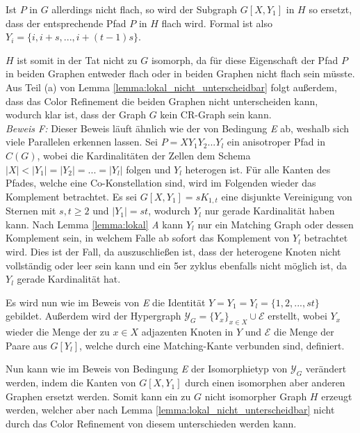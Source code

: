 Ist $P$ in $G$ allerdings nicht flach, so wird der Subgraph $G[X,Y_1]$ in $H$ so ersetzt, dass der entsprechende Pfad $P$ in $H$ flach wird.
Formal ist also $Y_i=\{i,i+s,...,i+(t-1)s\}$.

$H$ ist somit in der Tat nicht zu $G$ isomorph, da für diese Eigenschaft der Pfad $P$ in beiden Graphen entweder flach oder in beiden Graphen nicht flach sein müsste.
Aus Teil (a) von Lemma \ref{lemma:lokal_nicht_unterscheidbar} folgt außerdem, dass das Color Refinement die beiden Graphen nicht unterscheiden kann, wodurch klar ist, dass der Graph $G$ kein CR-Graph sein kann.\\

\emph{Beweis F:} Dieser Beweis läuft ähnlich wie der von Bedingung \emph{E} ab, weshalb sich viele Parallelen erkennen lassen.
Sei $P=XY_1Y_2...Y_l$ ein anisotroper Pfad in $C(G)$, wobei die Kardinalitäten der Zellen dem Schema $|X|<|Y_1|=|Y_2|=...=|Y_l|$ folgen und $Y_l$ heterogen ist.
Für alle Kanten des Pfades, welche eine Co-Konstellation sind, wird im Folgenden wieder das Komplement betrachtet.
Es sei $G[X,Y_1]=sK_{1,t}$ eine disjunkte Vereinigung von Sternen mit $s,t\geq 2$ und $|Y_1|=st$, wodurch $Y_l$ nur gerade Kardinalität haben kann.
Nach Lemma \ref{lemma:lokal} \emph{A} kann $Y_l$ nur ein Matching Graph oder dessen Komplement sein, in welchem Falle ab sofort das Komplement von $Y_l$ betrachtet wird.
Dies ist der Fall, da auszuschließen ist, dass der heterogene Knoten nicht vollständig oder leer sein kann und ein 5er \gls{zyklus} ebenfalls nicht möglich ist, da $Y_l$ gerade Kardinalität hat.

Es wird nun wie im Beweis von \emph{E} die Identität $Y=Y_1=Y_l=\{1,2,...,st\}$ gebildet.
Außerdem wird der Hypergraph $\mathcal{Y}_G=\{Y_x\}_{x\in X}\cup \mathcal{E}$ erstellt, wobei $Y_x$ wieder die Menge der zu $x\in X$ adjazenten Knoten in $Y$ und $\mathcal{E}$ die Menge der Paare aus $G[Y_l]$, welche durch eine Matching-Kante verbunden sind, definiert.

Nun kann wie im Beweis von Bedingung \emph{E} der Isomorphietyp von $\mathcal{Y}_G$ verändert werden, indem die Kanten von $G[X,Y_1]$ durch einen isomorphen aber anderen Graphen ersetzt werden.
Somit kann ein zu $G$ nicht isomorpher Graph $H$ erzeugt werden, welcher aber nach Lemma \ref{lemma:lokal_nicht_unterscheidbar} nicht durch das Color Refinement von diesem unterschieden werden kann.

